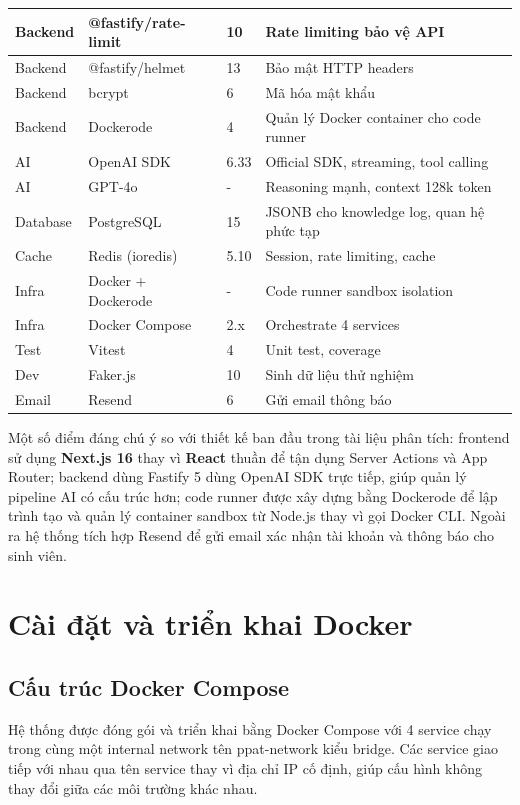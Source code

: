 \documentclass[../main.tex]{subfiles}
\begin{document}
{\begin{tabularx}{\textwidth}{|p{2.0cm}|p{4cm}|p{2.0cm}|X|}
\hline
Backend & @fastify/rate-limit & 10 & Rate limiting bảo vệ API \\
\hline
Backend & @fastify/helmet & 13 & Bảo mật HTTP headers \\
\hline
Backend & bcrypt & 6 & Mã hóa mật khẩu \\
\hline
Backend & Dockerode & 4 & Quản lý Docker container cho code runner \\
\hline
AI & OpenAI SDK & 6.33 & Official SDK, streaming, tool calling \\
\hline
AI & GPT-4o & - & Reasoning mạnh, context 128k token \\
\hline
Database & PostgreSQL & 15 & JSONB cho knowledge log, quan hệ phức tạp \\
\hline
Cache & Redis (ioredis) & 5.10 & Session, rate limiting, cache \\
\hline
Infra & Docker + Dockerode & - & Code runner sandbox isolation \\
\hline
Infra & Docker Compose & 2.x & Orchestrate 4 services \\
\hline
Test & Vitest & 4 & Unit test, coverage \\
\hline
Dev & Faker.js & 10 & Sinh dữ liệu thử nghiệm \\
\hline
Email & Resend & 6 & Gửi email thông báo \\
\hline
\end{tabularx}
}

Một số điểm đáng chú ý so với thiết kế ban đầu trong tài liệu phân tích: frontend sử dụng \textbf{Next.js 16} thay vì \textbf{React} thuần để tận dụng Server Actions và App Router; backend dùng Fastify 5 dùng OpenAI SDK trực tiếp, giúp quản lý pipeline AI có cấu trúc hơn; code runner được xây dựng bằng Dockerode để lập trình tạo và quản lý container sandbox từ Node.js thay vì gọi Docker CLI. Ngoài ra hệ thống tích hợp Resend để gửi email xác nhận tài khoản và thông báo cho sinh viên.

\section{Cài đặt và triển khai Docker}

\subsection{Cấu trúc Docker Compose}

Hệ thống được đóng gói và triển khai bằng Docker Compose với 4 service chạy trong cùng một internal network tên ppat-network kiểu bridge. Các service giao tiếp với nhau qua tên service thay vì địa chỉ IP cố định, giúp cấu hình không thay đổi giữa các môi trường khác nhau.
\end{document}
